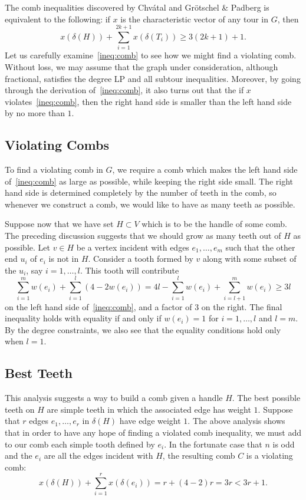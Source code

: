 \documentclass[11pt, letterpaper]{amsart}
\theoremstyle{plain}
\theoremstyle{definition}
\theoremstyle{remark}
\begin{document}
The comb inequalities discovered by Chv\'atal and Gr\"otschel \& Padberg is
equivalent to the following: if $x$ is the characteristic vector of any tour in
$G$, then
\begin{equation}\label{ineq:comb}
  x(\delta(H)) + \sum^{2k+1}_{i = 1}x(\delta(T_i)) \geq 3(2k+1) + 1.
\end{equation}
Let us carefully examine~\eqref{ineq:comb} to see how we might find a violating comb.
Without loss, we may assume that the graph under consideration, although
fractional, satisfies the degree LP and all subtour inequalities. Moreover, by
going through the derivation of~\eqref{ineq:comb}, it also turns out that the if $x$
violates~\eqref{ineq:comb}, then the right hand side is smaller than the left hand side by
no more than $1$.

\subsection{Violating Combs}
To find a violating comb in $G$, we require a comb which makes the left hand
side of~\eqref{ineq:comb} as large as possible, while keeping the right side small. The
right hand side is determined completely by the number of teeth in the comb, so
whenever we construct a comb, we would like to have as many teeth as possible.

Suppose now that we have set $H \subset V$ which is to be the handle of some
comb.  The preceding discussion suggests that we should grow as many teeth out
of $H$ as possible. Let $v \in H$ be a vertex incident with edges
$e_1,\ldots,e_m$ such that the other end $u_i$ of $e_i$ is not in $H$. Consider
a tooth formed by $v$ along with some subset of the $u_i$, say $i =
1,\ldots,l$. This tooth will contribute
\begin{equation*}
  \sum^m_{i = 1}w(e_i) + \sum^l_{i = 1} (4 - 2w(e_i)) = 4l - \sum^l_{i = 1} w(e_i) + \sum^m_{i = l + 1}w(e_i) \geq 3l
\end{equation*}
on the left hand side of~\eqref{ineq:comb}, and a factor of $3$ on the right. The final
inequality holds with equality if and only if $w(e_i) = 1$ for $i = 1,\ldots,l$
and $l = m$. By the degree constraints, we also see that the equality conditions
hold only when $l = 1$.

\subsection{Best Teeth}
This analysis suggests a way to build a comb given a handle $H$. The best
possible teeth on $H$ are simple teeth in which the associated edge has weight
$1$. Suppose that $r$ edges $e_1,\ldots,e_r$ in $\delta(H)$ have edge weight
$1$.  The above analysis shows that in order to have any hope of finding a
violated comb inequality, we must add to our comb each simple tooth defined by
$e_i$. In the fortunate case that $n$ is odd and the $e_i$ are all the edges
incident with $H$, the resulting comb $C$ is a violating comb:
\begin{equation*}
  x(\delta(H)) + \sum^r_{i = 1}x(\delta(e_i)) = r + (4 - 2)r = 3r < 3r + 1.
\end{equation*}
\end{document}
